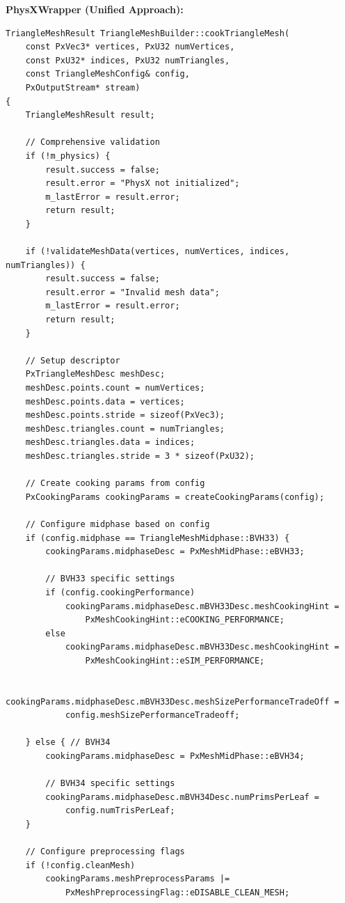 \textbf{PhysXWrapper (Unified Approach):}
\begin{lstlisting}[caption={Wrapper: Unified triangle mesh cooking}]
TriangleMeshResult TriangleMeshBuilder::cookTriangleMesh(
    const PxVec3* vertices, PxU32 numVertices,
    const PxU32* indices, PxU32 numTriangles,
    const TriangleMeshConfig& config,
    PxOutputStream* stream)
{
    TriangleMeshResult result;

    // Comprehensive validation
    if (!m_physics) {
        result.success = false;
        result.error = "PhysX not initialized";
        m_lastError = result.error;
        return result;
    }

    if (!validateMeshData(vertices, numVertices, indices, numTriangles)) {
        result.success = false;
        result.error = "Invalid mesh data";
        m_lastError = result.error;
        return result;
    }

    // Setup descriptor
    PxTriangleMeshDesc meshDesc;
    meshDesc.points.count = numVertices;
    meshDesc.points.data = vertices;
    meshDesc.points.stride = sizeof(PxVec3);
    meshDesc.triangles.count = numTriangles;
    meshDesc.triangles.data = indices;
    meshDesc.triangles.stride = 3 * sizeof(PxU32);

    // Create cooking params from config
    PxCookingParams cookingParams = createCookingParams(config);

    // Configure midphase based on config
    if (config.midphase == TriangleMeshMidphase::BVH33) {
        cookingParams.midphaseDesc = PxMeshMidPhase::eBVH33;

        // BVH33 specific settings
        if (config.cookingPerformance)
            cookingParams.midphaseDesc.mBVH33Desc.meshCookingHint =
                PxMeshCookingHint::eCOOKING_PERFORMANCE;
        else
            cookingParams.midphaseDesc.mBVH33Desc.meshCookingHint =
                PxMeshCookingHint::eSIM_PERFORMANCE;

        cookingParams.midphaseDesc.mBVH33Desc.meshSizePerformanceTradeOff =
            config.meshSizePerformanceTradeoff;

    } else { // BVH34
        cookingParams.midphaseDesc = PxMeshMidPhase::eBVH34;

        // BVH34 specific settings
        cookingParams.midphaseDesc.mBVH34Desc.numPrimsPerLeaf =
            config.numTrisPerLeaf;
    }

    // Configure preprocessing flags
    if (!config.cleanMesh)
        cookingParams.meshPreprocessParams |=
            PxMeshPreprocessingFlag::eDISABLE_CLEAN_MESH;


\end{lstlisting}
